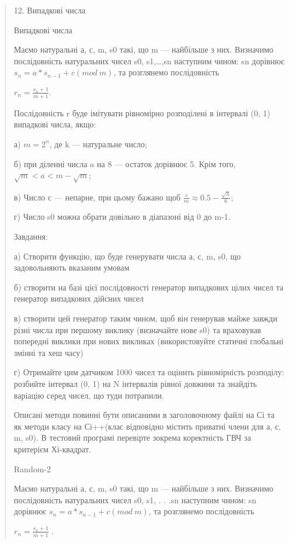 \documentclass[]{article}
\begin{document}
\begin{quote}

12. Випадкові числа

Випадкові числа

Маємо натуральні а, с, m, s0 такі, що m --- найбільше з них. Визначимо
послідовність натуральних чисел s0, s1,\ldots{},sn наступним чином: sn
дорівнює \(s_{n} = a*s_{n - 1} + c(mod\ m)\), та розглянемо
послідовність

\(r_{n} = \frac{s_{n} + 1}{m + 1}\).

Послідовність r буде імітувати рівномірно розподілені в інтервалі (0, 1)
випадкові числа, якщо:

а) \({m = 2}^{n}\), де k --- натуральне число;

б) при діленні числа \(a\) на 8 --- остаток дорівнює 5. Крім того,
\(\sqrt{m} < a < m - \sqrt{m}\);

в) Число с --- непарне, при цьому бажано щоб
\(\frac{s}{m} \approx 0.5 - \frac{\sqrt{3}}{6}\);

г) Число s0 можна обрати довільно в діапазоні від 0 до m-1.

Завдання:

а) Створити функцію, що буде генерувати числа а, с, m, s0, що
задовольняють вказаним умовам

б) створити на базі цієї послідовності генератор випадкових цілих чисел
та генератор випадкових дійсних чисел

в) створити цей генератор таким чином, щоб він генерував майже завжди
різні числа при першому виклику (визначайте нове s0) та враховував
попередні виклики при нових викликах (використовуйте статичні глобальні
змінні та хеш часу)

г) Отримайте цим датчиком 1000 чисел та оцінить рівномірність розподілу:
розбийте інтервал (0, 1) на N інтервалів рівної довжини та знайдіть
варіацію серед чисел, що туди потрапили.

Описані методи повинні бути описаними в заголовочному файлі на Сі та як
методи класу на Сі++(клас відповідно містить приватні члени для а, с, m,
s0). В тестовий програмі перевірте зокрема коректність ГВЧ за критерієм
Хі-квадрат.

Random-2

Маємо натуральні а, с, m, s0 такі, що m --- найбільше з них. Визначимо
послідовність натуральних чисел s0, s1, . . .sn наступним чином: sn
дорівнює \(s_{n} = a*s_{n - 1} + c(mod\ m)\), та розглянемо
послідовність

\(r_{n} = \frac{s_{n} + 1}{m + 1}\) .


\end{quote}
\end{document}
